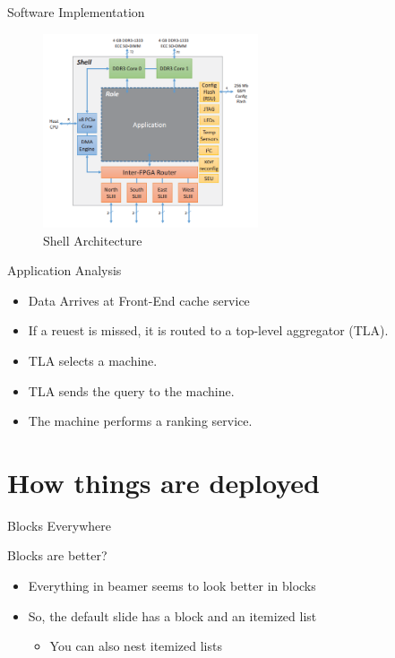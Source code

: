 \documentclass[t]{beamer}
\begin{document}
\begin{frame}{Software Implementation}
    \begin{figure}
        \includegraphics[width=2.5in]{img/shell-architecture.png}
        \caption{Shell Architecture}
        \label{fig:shell-architecture}
    \end{figure}
\end{frame}

\begin{frame}{Application Analysis}
    \begin{itemize}
        \item Data Arrives at Front-End cache service
        \item If a reuest is missed, it is routed to a top-level aggregator (TLA).
        \item TLA selects a machine.
        \item TLA sends the query to the machine.
        \item The machine performs a ranking service.
    \end{itemize}
\end{frame}

\section{How things are deployed}

\begin{frame}{Blocks Everywhere}
  \begin{block}{Blocks are better?}
    \begin{itemize}
    \item Everything in beamer seems to look better in blocks
    \item So, the default slide has a block and an itemized list
      \begin{itemize}
      \item You can also nest itemized lists
      \end{itemize}
    \end{itemize}
  \end{block}
\end{frame}
\end{document}
